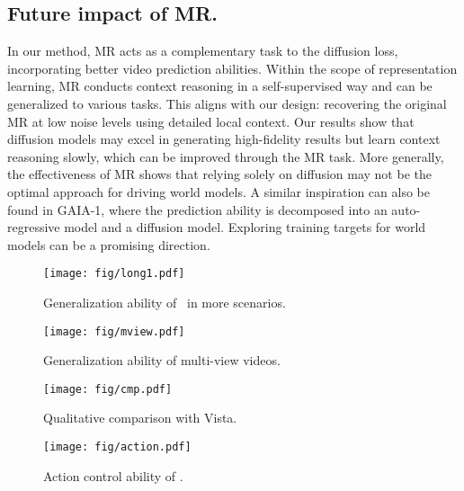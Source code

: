 \subsection{Future impact of MR.}
In our method, MR acts as a complementary task to the diffusion loss, incorporating better video prediction abilities. Within the scope of representation learning, MR conducts context reasoning in a self-supervised way and can be generalized to various tasks. This aligns with our design: recovering the original MR at low noise levels using detailed local context. Our results show that diffusion models may excel in generating high-fidelity results but learn context reasoning slowly, which can be improved through the MR task. More generally, the effectiveness of MR shows that relying solely on diffusion may not be the optimal approach for driving world models. A similar inspiration can also be found in GAIA-1, where the prediction ability is decomposed into an auto-regressive model and a diffusion model. Exploring training targets for world models can be a promising direction.

\begin{figure*}[t]
  \centering
   \texttt{[image: fig/long1.pdf]}
   \caption{Generalization ability of \ourmethod\ in more scenarios.}
   \label{fig:vis_long}
\end{figure*}
\begin{figure*}[h]
  \centering
   \texttt{[image: fig/mview.pdf]}
   \caption{Generalization ability of multi-view videos.}
   \label{fig:vis_mview}
\end{figure*}

\begin{figure*}[t]
  \centering
   \texttt{[image: fig/cmp.pdf]}
   \caption{Qualitative comparison with Vista.}
   \label{fig:vis_cmp}
\end{figure*}

\begin{figure*}[h]
  \centering
   \texttt{[image: fig/action.pdf]}
   \caption{Action control ability of \ourmethod.}
   \label{fig:vis_action}
\end{figure*}

